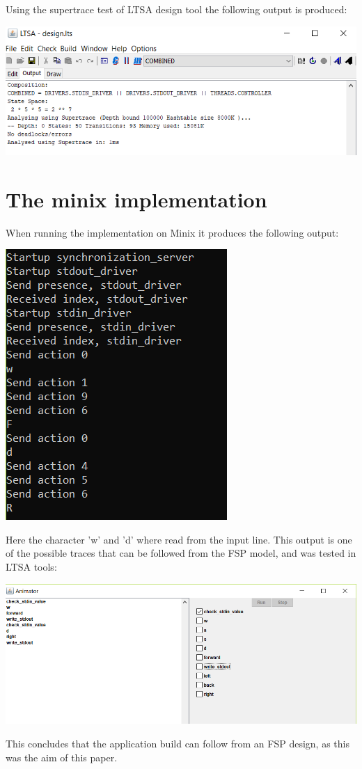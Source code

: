 Using the supertrace test of LTSA design tool the following output is
produced:

\includegraphics{../img/supertrace.png}

\hypertarget{the-minix-implementation}{%
\section{The minix implementation}\label{the-minix-implementation}}

When running the implementation on Minix it produces the following
output:

\includegraphics{../img/output.png}

Here the character 'w' and 'd' where read from the input line. This
output is one of the possible traces that can be followed from the FSP
model, and was tested in LTSA tools:

\includegraphics{../img/ltsa_output.png}

This concludes that the application build can follow from an FSP design,
as this was the aim of this paper.
